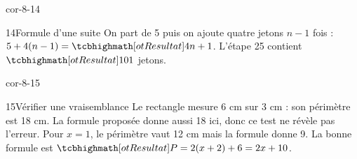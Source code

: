 \begin{blocLivre}{cor-8-14}\begin{corrige}{14}{Formule d’une suite}
On part de 5 puis on ajoute quatre jetons $n-1$ fois : $5+4(n-1)=\res{4n+1}$. L’étape 25 contient $\res{101}$ jetons.
\end{corrige}\end{blocLivre}
\begin{blocLivre}{cor-8-15}\begin{corrige}{15}{Vérifier une vraisemblance}
Le rectangle mesure 6 cm sur 3 cm : son périmètre est 18 cm. La formule proposée donne aussi 18 ici, donc ce test ne révèle pas l’erreur. Pour $x=1$, le périmètre vaut 12 cm mais la formule donne 9. La bonne formule est $\res{P=2(x+2)+6=2x+10}$.
\label{fig-cor-8-15}
\end{corrige}\end{blocLivre}

